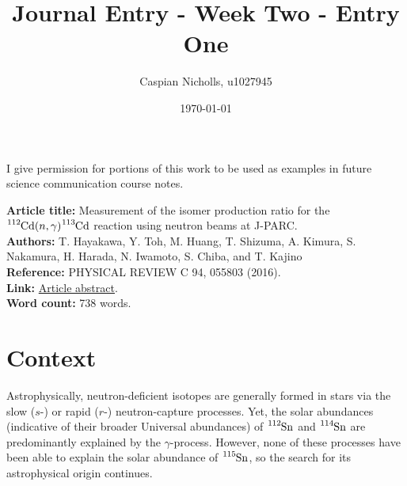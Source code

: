 \documentclass[12pt,a4paper]{article}
\begin{document}
\title{Journal Entry - Week Two - Entry One}
\author{Caspian Nicholls, u1027945}
\date{\today}

\maketitle

\noindent
I give permission for portions of this work to be used as examples in future science communication course notes.

\medskip
\noindent
\textbf{Article title:} Measurement of the isomer production ratio for the $\ce{^{112}Cd}(n,\gamma)\ce{^{113}Cd}$ reaction using neutron beams at J-PARC. \\
\textbf{Authors:} T. Hayakawa, Y. Toh, M. Huang, T. Shizuma, A. Kimura, S. Nakamura, H. Harada, N. Iwamoto, S. Chiba, and T. Kajino\\
\textbf{Reference:} PHYSICAL REVIEW C 94, 055803 (2016). \\
\textbf{Link:}  \href{https://journals.aps.org/prc/abstract/10.1103/PhysRevC.94.055803}{Article abstract}. \\
\textbf{Word count:} 738 words.

\section*{Context}

Astrophysically, neutron-deficient isotopes are generally formed in stars via the slow ($s$-) or rapid ($r$-) neutron-capture processes. Yet, the solar abundances (indicative of their broader Universal abundances) of $\ce{^{112}Sn}$ and $\ce{^{114}Sn}$ are predominantly explained by the $\gamma$-process. However, none of these processes have been able to explain the solar abundance of $\ce{^{115}Sn}$, so the search for its astrophysical origin continues.

\end{document}
